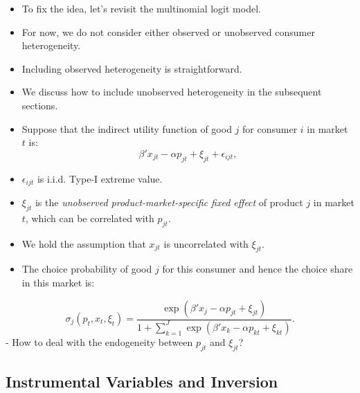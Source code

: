 \documentclass[
]{book}
\providecommand{\tightlist}{%
  \setlength{\itemsep}{0pt}\setlength{\parskip}{0pt}}
\begin{document}
\begin{itemize}
\tightlist
\item
  To fix the idea, let's revisit the multinomial logit model.
\item
  For now, we do not consider either observed or unobserved consumer heterogeneity.
\item
  Including observed heterogeneity is straightforward.
\item
  We discuss how to include unobserved heterogeneity in the subsequent sections.
\item
  Suppose that the indirect utility function of good \(j\) for consumer \(i\) in market \(t\) is:
  \begin{equation}
  \beta' x_{jt}  - \alpha p_{jt} + \xi_{jt} + \epsilon_{ijt},
  \end{equation}
\item
  \(\epsilon_{ijt}\) is i.i.d. Type-I extreme value.
\item
  \(\xi_{jt}\) is the \emph{unobserved product-market-specific fixed effect} of product \(j\) in market \(t\), which can be correlated with \(p_{jt}\).
\item
  We hold the assumption that \(x_{jt}\) is uncorrelated with \(\xi_{jt}\).
\item
  The choice probability of good \(j\) for this consumer and hence the choice share in this market is:
\end{itemize}

\begin{equation}
\sigma_j(p_t, x_t, \xi_t) = \frac{\exp(\beta' x_j - \alpha p_{jt} + \xi_{jt})}{1 + \sum_{k = 1}^J\exp(\beta' x_k - \alpha p_{kt} +  \xi_{kt} ) }.
\end{equation}
- How to deal with the endogeneity between \(p_{jt}\) and \(\xi_{jt}\)?

\hypertarget{instrumental-variables-and-inversion}{%
\subsection{Instrumental Variables and Inversion}\label{instrumental-variables-and-inversion}}
\end{document}
